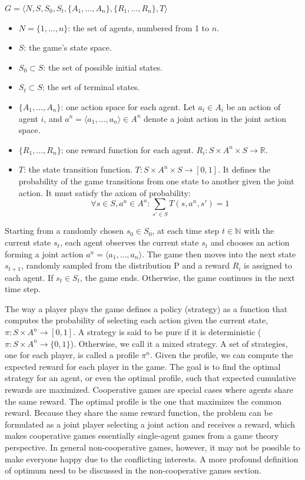 \documentclass[]{interact}
\theoremstyle{plain}%
\theoremstyle{definition}
\theoremstyle{remark}
\begin{document}
$G = \langle N,S,S_0,S_t,\{A_1,\ldots,A_n\},\{R_1,\ldots,R_n\},T \rangle$
\begin{itemize}
    \item $N = \{1, ..., n\}$: the set of agents, numbered from 1 to $n$.
    \item $S$: the game’s state space.
    \item $S_0 \subset S$: the set of possible initial states.
    \item $S_t \subset S$: the set of terminal states.
    \item $\{A_1,\ldots,A_n\}$: one action space for each agent. Let $a_i \in A_i$ be an action of agent $i$, and $a^n=\langle a_1,\ldots,a_n \rangle \in A^n$ denote a joint action in the joint action space.
    \item $\{R_1,\ldots,R_n\}$: one reward function for each agent. $R_i:S \times A^n \times S \rightarrow \mathbb{R}$.
    \item $T$: the state transition function. $T:S \times A^n \times S \rightarrow [0,1]$. It defines the probability of the game transitions from one state to another given the joint action. It must satisfy the axiom of probability:
    \begin{equation}
        \forall s \in S,a^n \in A^n: \sum_{s' \in S}{T(s,a^n,s')}=1
        \label{eq:state_transition}
    \end{equation}
\end{itemize}
Starting from a randomly chosen $s_0 \in S_0$, at each time step $t \in \mathbb{N}$ with the current state $s_t$, each agent observes the current state $s_t$ and chooses an action forming a joint action $a^n=\langle a_1,\ldots,a_n \rangle$. The game then moves into the next state $s_{t+1}$, randomly sampled from the distribution P and a reward $R_i$ is assigned to each agent. If $s_t \in S_t$, the game ends. Otherwise, the game continues in the next time step.

The way a player plays the game defines a policy (strategy) as a function that computes the probability of selecting each action given the current state, $\pi:S \times A^n \rightarrow [0,1]$. A strategy is said to be pure if it is deterministic ($\pi:S \times A^n \rightarrow \{0,1\}$). Otherwise, we call it a mixed strategy. A set of strategies, one for each player, is called a profile $\pi^n$. Given the profile, we can compute the expected reward for each player in the game. The goal is to find the optimal strategy for an agent, or even the optimal profile, such that expected cumulative rewards are maximized. Cooperative games are special cases where agents share the same reward. The optimal profile is the one that maximizes the common reward. Because they share the same reward function, the problem can be formulated as a joint player selecting a joint action and receives a reward, which makes cooperative games essentially single-agent games from a game theory perspective. In general non-cooperative games, however, it may not be possible to make everyone happy due to the conflicting interests. A more profound definition of optimum need to be discussed in the non-cooperative games section.
\end{document}
